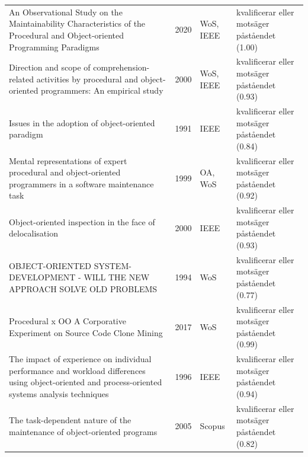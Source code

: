\begin{longtable}{@{}%
  >{\raggedright\arraybackslash}p{}c%
  >{\raggedright\arraybackslash}p{}%
  >{\raggedright\arraybackslash}p{}@{}}
An Observational Study on the Maintainability Characteristics of the Procedural and Object-oriented Programming Paradigms & 2020 & WoS, IEEE & kvalificerar eller motsäger påståendet (1.00) \\
Direction and scope of comprehension-related activities by procedural and object-oriented programmers: An empirical study & 2000 & WoS, IEEE & kvalificerar eller motsäger påståendet (0.93) \\
Issues in the adoption of object-oriented paradigm & 1991 & IEEE & kvalificerar eller motsäger påståendet (0.84) \\
Mental representations of expert procedural and object-oriented programmers in a software maintenance task & 1999 & OA, WoS & kvalificerar eller motsäger påståendet (0.92) \\
Object-oriented inspection in the face of delocalisation & 2000 & IEEE & kvalificerar eller motsäger påståendet (0.93) \\
OBJECT-ORIENTED SYSTEM-DEVELOPMENT - WILL THE NEW APPROACH SOLVE OLD PROBLEMS & 1994 & WoS & kvalificerar eller motsäger påståendet (0.77) \\
Procedural x OO A Corporative Experiment on Source Code Clone Mining & 2017 & WoS & kvalificerar eller motsäger påståendet (0.99) \\
The impact of experience on individual performance and workload differences using object-oriented and process-oriented systems analysis techniques & 1996 & IEEE & kvalificerar eller motsäger påståendet (0.94) \\
The task-dependent nature of the maintenance of object-oriented programs & 2005 & Scopus & kvalificerar eller motsäger påståendet (0.82) \\
\end{longtable}
\endgroup
